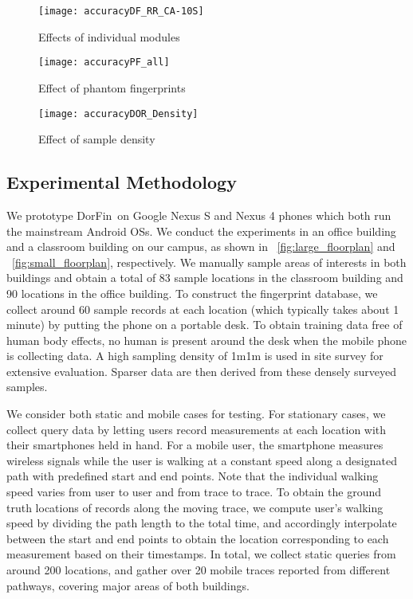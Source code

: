 \documentclass[10pt,conference,compsocconf,letterpaper]{./sty/IEEEtran}
\def\fullfigwidth{1.0\textwidth}
\def\3figwidth{0.3\textwidth}
\def\sysname{DorFin}
\begin{document}
\begin{figure*}[t]
	\centering
	\begin{minipage}[t]{\3figwidth}\centering
		\centering
  		\texttt{[image: accuracyDF\_RR\_CA-10S]}
  		\caption{Effects of individual modules}
 		\label{fig:accuracyDF_RR_CA}
	\end{minipage}	
	\hspace{0.01in}
	\begin{minipage}[t]{\3figwidth}\centering	
		\texttt{[image: accuracyPF\_all]}
  		\caption{Effect of phantom fingerprints}
  		\label{fig:accuracyPF}
	\end{minipage}
	\hspace{0.01in}
	\begin{minipage}[t]{\3figwidth}\centering	
		\texttt{[image: accuracyDOR\_Density]}
  		\caption{Effect of sample density}
  		\label{fig:accuracyDOR_Density}
	\end{minipage}
\end{figure*}




\subsection{Experimental Methodology}
We prototype \sysname~on Google Nexus S and Nexus 4 phones which both run the mainstream Android OSs. We conduct the experiments in an office building and a classroom building on our campus, as shown in \figurename~\ref{fig:large_floorplan} and \figurename~\ref{fig:small_floorplan}, respectively. We manually sample areas of interests in both buildings and obtain a total of 83 sample locations in the classroom building and 90 locations in the office building. To construct the fingerprint database, we collect around 60 sample records at each location (which typically takes about 1 minute) by putting the phone on a portable desk. To obtain training data free of human body effects, no human is present around the desk when the mobile phone is collecting data. A high sampling density of 1m1m is used in site survey for extensive evaluation. Sparser data are then derived from these densely surveyed samples.

We consider both static and mobile cases for testing. For stationary cases, we collect query data by letting users record measurements at each location with their smartphones held in hand. For a mobile user, the smartphone measures wireless signals while the user is walking at a constant speed along a designated path with predefined start and end points. Note that the individual walking speed varies from user to user and from trace to trace. To obtain the ground truth locations of records along the moving trace, we compute user's walking speed by dividing the path length to the total time, and accordingly interpolate between the start and end points to obtain the location corresponding to each measurement based on their timestamps. In total, we collect static queries from around 200 locations, and gather over 20 mobile traces reported from different pathways, covering major areas of both buildings. 
\end{document}
